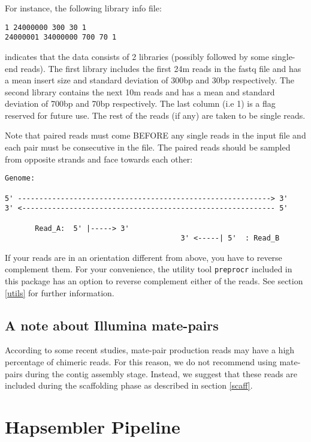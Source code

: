 \documentclass[12pt,a4paper]{report}
\begin{document}
For instance, the following library info file:

\begin{verbatim}
1 24000000 300 30 1
24000001 34000000 700 70 1
\end{verbatim}

indicates that the data consists of 2 libraries (possibly followed by some single-end reads). The first library includes the first 24m reads in the fastq file and has a mean insert size and standard deviation of 300bp and 30bp respectively. The second library contains the next 10m reads and has a mean and standard deviation of 700bp and 70bp respectively. The last column (i.e 1) is a flag reserved for future use. The rest of the reads (if any) are taken to be single reads. 

Note that paired reads must come BEFORE any single reads in the input file and each pair must be consecutive in the file. The paired reads should be sampled from opposite strands and face towards each other:

\begin{verbatim}
Genome:

5' -----------------------------------------------------------> 3'
3' <----------------------------------------------------------- 5'

       Read_A:  5' |-----> 3'
                                         3' <-----| 5'  : Read_B
\end{verbatim}

If your reads are in an orientation different from above, you have to reverse complement them. For your convenience, the utility tool \texttt{preprocr} included in this package has an option to reverse complement either of the reads. See section \ref{utils} for further information.

\subsection{A note about Illumina mate-pairs}

According to some recent studies, mate-pair production reads may have a high percentage of chimeric reads. For this reason, we do not recommend using mate-pairs during the contig assembly stage. Instead, we suggest that these reads are included during the scaffolding phase as described in section \ref{scaff}. 

\section{Hapsembler Pipeline}
\end{document}
